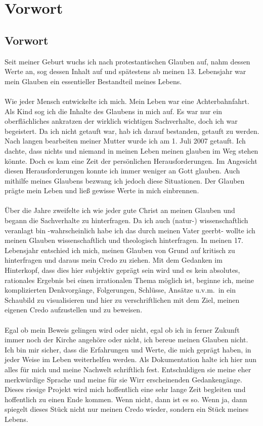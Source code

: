 \part{Vorwort}
\chapter*{Vorwort}
Seit meiner Geburt wuchs ich nach protestantischen Glauben auf, nahm dessen Werte an, sog dessen Inhalt auf und spätestens ab meinen 13. Lebensjahr war mein Glauben ein essentieller Bestandteil meines Lebens. 
\\~\\
Wie jeder Mensch entwickelte ich mich. Mein Leben war eine Achterbahnfahrt. Als Kind sog ich die Inhalte des Glaubens in mich auf. Es war nur ein oberflächliches ankratzen der wirklich wichtigen Sachverhalte, doch ich war begeistert. Da ich nicht getauft war, hab ich darauf bestanden, getauft zu werden. Nach langen bearbeiten meiner Mutter wurde ich am 1. Juli 2007 getauft. Ich dachte, dass nichts und niemand in meinen Leben meinen glauben im Weg stehen könnte. Doch es kam eine  Zeit der persönlichen Herausforderungen. Im Angesicht diesen Herausforderungen   
konnte ich immer weniger an Gott glauben. Auch mithilfe meines Glaubens bezwang ich jedoch diese Situationen. Der Glauben prägte mein Leben und ließ gewisse Werte in mich einbrennen. 
\\~\\
Über die Jahre zweifelte ich wie jeder gute Christ an meinen Glauben und begann die Sachverhalte zu hinterfragen. Da ich auch (natur-) wissenschaftlich veranlagt bin  -wahrscheinlich habe ich das durch meinen Vater geerbt- wollte ich meinen Glauben wissenschaftlich und theologisch hinterfragen. In meinen 17. Lebensjahr entschied ich mich, meinen Glauben von Grund auf kritisch zu hinterfragen und daraus mein Credo zu ziehen. Mit dem Gedanken im Hinterkopf, dass dies hier subjektiv geprägt sein wird und es kein absolutes, rationales Ergebnis bei einen irrationalen Thema möglich ist, beginne ich, meine komplizierten Denkvorgänge, Folgerungen, Schlüsse, Ansätze u.v.m.\ in ein Schaubild zu visualisieren und hier zu verschriftlichen mit dem Ziel, meinen eigenen Credo aufzustellen und zu beweisen.
\\~\\
Egal ob mein Beweis gelingen wird oder nicht, egal ob ich in ferner Zukunft immer noch der Kirche angehöre oder nicht, ich bereue meinen Glauben nicht. Ich bin mir sicher, dass die Erfahrungen und Werte, die mich geprägt haben, in jeder Weise im Leben weiterhelfen werden. Als Dokumentation halte ich hier nun alles für mich und meine Nachwelt schriftlich fest. Entschuldigen sie meine eher merkwürdige Sprache und meine für sie Wirr erscheinenden Gedankengänge. Dieses riesige Projekt wird mich hoffentlich eine sehr lange Zeit begleiten und hoffentlich zu einen Ende kommen. Wenn nicht, dann ist es so. Wenn ja, dann spiegelt dieses Stück nicht nur meinen Credo wieder, sondern ein Stück meines Lebens.

